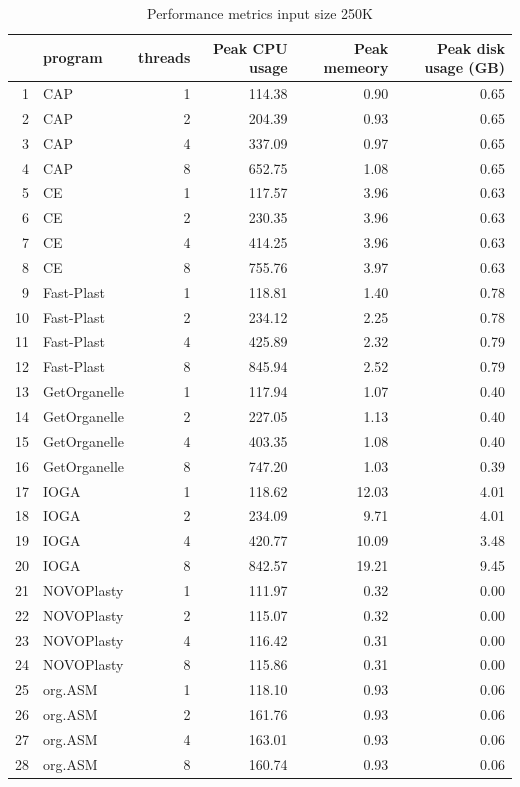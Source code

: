 \documentclass{bmcart}
\begin{document}
\begin{backmatter}
\begin{table}[ht]
\caption{Performance metrics input size 250K}
\label{tab:perform250K}
\centering
\begin{tabular}{rlrrrr}
  \hline
 & program & threads & Peak CPU usage & Peak memeory & Peak disk usage (GB) \\ 
  \hline
1 & CAP &   1 & 114.38 & 0.90 & 0.65 \\ 
  2 & CAP &   2 & 204.39 & 0.93 & 0.65 \\ 
  3 & CAP &   4 & 337.09 & 0.97 & 0.65 \\ 
  4 & CAP &   8 & 652.75 & 1.08 & 0.65 \\ 
  5 & CE &   1 & 117.57 & 3.96 & 0.63 \\ 
  6 & CE &   2 & 230.35 & 3.96 & 0.63 \\ 
  7 & CE &   4 & 414.25 & 3.96 & 0.63 \\ 
  8 & CE &   8 & 755.76 & 3.97 & 0.63 \\ 
  9 & Fast-Plast &   1 & 118.81 & 1.40 & 0.78 \\ 
  10 & Fast-Plast &   2 & 234.12 & 2.25 & 0.78 \\ 
  11 & Fast-Plast &   4 & 425.89 & 2.32 & 0.79 \\ 
  12 & Fast-Plast &   8 & 845.94 & 2.52 & 0.79 \\ 
  13 & GetOrganelle &   1 & 117.94 & 1.07 & 0.40 \\ 
  14 & GetOrganelle &   2 & 227.05 & 1.13 & 0.40 \\ 
  15 & GetOrganelle &   4 & 403.35 & 1.08 & 0.40 \\ 
  16 & GetOrganelle &   8 & 747.20 & 1.03 & 0.39 \\ 
  17 & IOGA &   1 & 118.62 & 12.03 & 4.01 \\ 
  18 & IOGA &   2 & 234.09 & 9.71 & 4.01 \\ 
  19 & IOGA &   4 & 420.77 & 10.09 & 3.48 \\ 
  20 & IOGA &   8 & 842.57 & 19.21 & 9.45 \\ 
  21 & NOVOPlasty &   1 & 111.97 & 0.32 & 0.00 \\ 
  22 & NOVOPlasty &   2 & 115.07 & 0.32 & 0.00 \\ 
  23 & NOVOPlasty &   4 & 116.42 & 0.31 & 0.00 \\ 
  24 & NOVOPlasty &   8 & 115.86 & 0.31 & 0.00 \\ 
  25 & org.ASM &   1 & 118.10 & 0.93 & 0.06 \\ 
  26 & org.ASM &   2 & 161.76 & 0.93 & 0.06 \\ 
  27 & org.ASM &   4 & 163.01 & 0.93 & 0.06 \\ 
  28 & org.ASM &   8 & 160.74 & 0.93 & 0.06 \\ 
   \hline
\end{tabular}
\end{table}


\end{backmatter}
\end{document}
